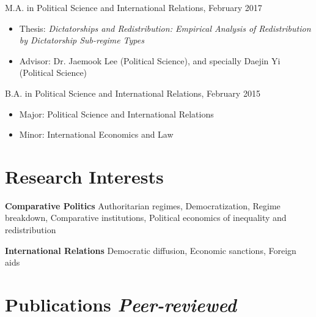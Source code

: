 \documentclass[margin,line]{res}
\begin{document}
\begin{resume}
\vspace*{-4mm}
M.A. in Political Science and International Relations, February 2017\\
\vspace*{-4mm}
\begin{itemize} \itemsep -1mm 
	\item[]  \hspace*{-6mm} Thesis: {\it Dictatorships and Redistribution: Empirical Analysis of Redistribution by Dictatorship Sub-regime Types}
	\item[]  \hspace*{-6mm} Advisor: Dr. Jaemook Lee (Political Science), and specially Daejin Yi (Political Science)
\end{itemize}
\vspace*{-3mm}
B.A. in Political Science and International Relations, February 2015\\
\vspace*{-4mm}
\begin{itemize} \itemsep -1mm
	\item[]  \hspace*{-6mm} Major: Political Science and International Relations
	\item[]  \hspace*{-6mm} Minor: International Economics and Law
\end{itemize}

\section{\sc Research Interests}
{\bf Comparative Politics} Authoritarian regimes, Democratization, Regime breakdown, Comparative institutions, Political economics of inequality and redistribution

\vspace{-.3cm}
{\bf International Relations} Democratic diffusion, Economic sanctions, Foreign aids

\section{\sc Publications {\it Peer-reviewed}}


\end{resume}
\end{document}
